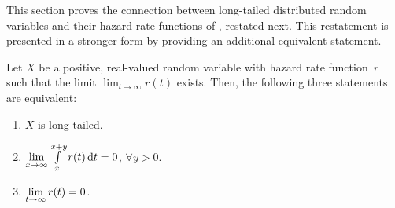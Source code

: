 

This section proves the connection between long-tailed distributed random variables and their hazard rate functions of , restated next. This restatement is presented in a stronger form 
by providing
an additional equivalent statement.


\begin{restatelemma}	
	Let $X$ be a positive, real-valued random variable with hazard rate function~$r$ such that the limit \mbox{$\lim_{t\rightarrow\infty}r(t)$} exists.
	Then, the following three statements are equivalent:
	\begin{enumerate}
		\item $X$ is long-tailed. \label{proof:long_tail_1}
		\item $\LIM{x} \integral[t]{x}{x+y}{r(t)} = 0$, \quantorsep $\forall y > 0$.
		\label{proof:long_tail_2}
		\item $\LIM{t} r(t)=0$.
		\label{proof:long_tail_3}
	\end{enumerate}
\end{restatelemma}

